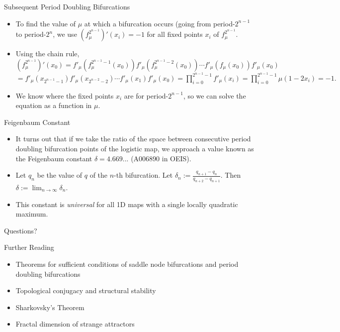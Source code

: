 \documentclass[aspectratio=169]{beamer}
\begin{document}
\begin{frame}{Subsequent Period Doubling Bifurcations}
\begin{itemize}
    \item To find the value of $\mu$ at which a bifurcation occurs (going from period-$2^{n-1}$ to period-$2^n$, we use $(f_\mu^{2^{n-1}})'(x_i) = -1$ for all fixed points $x_i$ of $f_\mu^{2^{n-1}}$. 
    \item Using the chain rule, $(f_\mu^{2^{n-1}})'(x_0) = f'_\mu(f^{2^{n-1}-1}_\mu(x_0))f'_\mu(f^{2^{n-1}-2}_\mu(x_0)) \cdots f'_\mu(f_\mu(x_0)) f'_\mu(x_0)$ $= f'_\mu(x_{2^{n-1}-1}) f'_\mu(x_{2^{n-2}-2}) \cdots f'_\mu(x_1) f'_\mu(x_0) = \displaystyle \prod_{i=0}^{2^{n-1}-1} f'_\mu(x_i) = \displaystyle \prod_{i=0}^{2^{n-1}-1} \mu(1-2x_i) = -1.$
    \item We know where the fixed points $x_i$ are for period-$2^{n-1}$, so we can solve the equation as a function in $\mu$.
\end{itemize}
\end{frame}

\begin{frame}{Feigenbaum Constant}
\begin{itemize}
    \item It turns out that if we take the ratio of the space between consecutive period doubling bifurcation points of the logistic map, we approach a value known as the Feigenbaum constant $\delta=4.669...$ (A006890 in OEIS). 
    \item Let $q_n$ be the value of $q$ of the $n$-th bifurcation. Let $\delta_n := \frac{q_{n+1} - q_n}{q_{n+2} - q_{n+1}}$. Then $\delta := \displaystyle \lim_{n \rightarrow \infty} \delta_n$. 
    \item This constant is \textit{universal} for all 1D maps with a single locally quadratic maximum. 
\end{itemize}
\end{frame}

\begin{frame}{}
      \begin{center}
    {\color{sigma@mainblue} \LARGE Questions?}
  \end{center}
\end{frame}

\begin{frame}{Further Reading}
    \begin{itemize}
        \item Theorems for sufficient conditions of saddle node bifurcations and period doubling bifurcations
        \item Topological conjugacy and structural stability
        \item Sharkovsky's Theorem
        \item Fractal dimension of strange attractors
    \end{itemize}
\end{frame}
\end{document}
